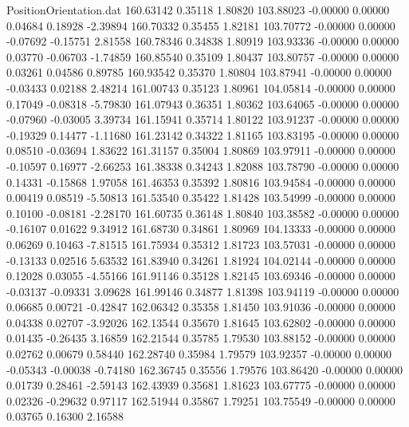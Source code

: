 \begin{filecontents}{PositionOrientation.dat}
 160.63142    0.35118    1.80820   103.88023   -0.00000    0.00000    0.04684    0.18928   -2.39894
 160.70332    0.35455    1.82181   103.70772   -0.00000    0.00000   -0.07692   -0.15751    2.81558
 160.78346    0.34838    1.80919   103.93336   -0.00000    0.00000    0.03770   -0.06703   -1.74859
 160.85540    0.35109    1.80437   103.80757   -0.00000    0.00000    0.03261    0.04586    0.89785
 160.93542    0.35370    1.80804   103.87941   -0.00000    0.00000   -0.03433    0.02188    2.48214
 161.00743    0.35123    1.80961   104.05814   -0.00000    0.00000    0.17049   -0.08318   -5.79830
 161.07943    0.36351    1.80362   103.64065   -0.00000    0.00000   -0.07960   -0.03005    3.39734
 161.15941    0.35714    1.80122   103.91237   -0.00000    0.00000   -0.19329    0.14477   -1.11680
 161.23142    0.34322    1.81165   103.83195   -0.00000    0.00000    0.08510   -0.03694    1.83622
 161.31157    0.35004    1.80869   103.97911   -0.00000    0.00000   -0.10597    0.16977   -2.66253
 161.38338    0.34243    1.82088   103.78790   -0.00000    0.00000    0.14331   -0.15868    1.97058
 161.46353    0.35392    1.80816   103.94584   -0.00000    0.00000    0.00419    0.08519   -5.50813
 161.53540    0.35422    1.81428   103.54999   -0.00000    0.00000    0.10100   -0.08181   -2.28170
 161.60735    0.36148    1.80840   103.38582   -0.00000    0.00000   -0.16107    0.01622    9.34912
 161.68730    0.34861    1.80969   104.13333   -0.00000    0.00000    0.06269    0.10463   -7.81515
 161.75934    0.35312    1.81723   103.57031   -0.00000    0.00000   -0.13133    0.02516    5.63532
 161.83940    0.34261    1.81924   104.02144   -0.00000    0.00000    0.12028    0.03055   -4.55166
 161.91146    0.35128    1.82145   103.69346   -0.00000    0.00000   -0.03137   -0.09331    3.09628
 161.99146    0.34877    1.81398   103.94119   -0.00000    0.00000    0.06685    0.00721   -0.42847
 162.06342    0.35358    1.81450   103.91036   -0.00000    0.00000    0.04338    0.02707   -3.92026
 162.13544    0.35670    1.81645   103.62802   -0.00000    0.00000    0.01435   -0.26435    3.16859
 162.21544    0.35785    1.79530   103.88152   -0.00000    0.00000    0.02762    0.00679    0.58440
 162.28740    0.35984    1.79579   103.92357   -0.00000    0.00000   -0.05343   -0.00038   -0.74180
 162.36745    0.35556    1.79576   103.86420   -0.00000    0.00000    0.01739    0.28461   -2.59143
 162.43939    0.35681    1.81623   103.67775   -0.00000    0.00000    0.02326   -0.29632    0.97117
 162.51944    0.35867    1.79251   103.75549   -0.00000    0.00000    0.03765    0.16300    2.16588

\end{filecontents}

